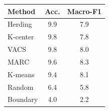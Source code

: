 \begin{tabular}{lcc}
\toprule
Method & Acc. & Macro-F1 \\
\midrule
Herding & 9.9 & 7.9 \\
K-center & 9.8 & 7.8 \\
VACS & 9.8 & 8.0 \\
MARC & 9.6 & 8.3 \\
K-means & 9.4 & 8.1 \\
Random & 6.4 & 5.8 \\
Boundary & 4.0 & 2.2 \\
\bottomrule
\end{tabular}
